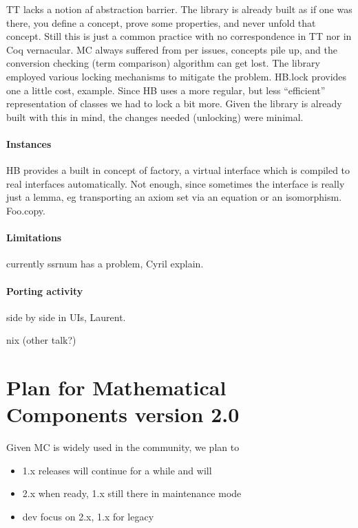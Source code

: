 \documentclass{easychair}
\begin{document}
TT lacks a notion af abstraction barrier. The library is already built
as if one was there, you define a concept, prove some properties, and never
unfold that concept. Still this is just a common practice with no correspondence
in TT nor in Coq vernacular. MC always suffered from per issues, concepts pile up,
and the conversion checking (term comparison) algorithm can get lost. The
library employed various locking mechanisms to mitigate the problem. HB.lock
provides one a little cost, example.
Since HB uses a more regular, but less ``efficient'' representation of classes
we had to lock a bit more. Given the library is already built with this in mind,
the changes needed (unlocking) were minimal.

\paragraph{Instances}

HB provides a built in concept of factory, a virtual interface which is
compiled to real interfaces automatically. Not enough, since sometimes the
interface is really just a lemma, eg transporting an axiom set via an equation
or an isomorphism. Foo.copy.

\paragraph{Limitations}

currently ssrnum has a problem, Cyril explain.

\paragraph{Porting activity}

side by side in UIs, Laurent.

nix (other talk?)

\section{Plan for Mathematical Components version 2.0}

Given MC is widely used in the community, we plan to

\begin{itemize}
\item 1.x releases will continue for a while and will
\item 2.x when ready, 1.x still there in maintenance mode
\item dev focus on 2.x, 1.x for legacy
\end{itemize}

\label{sect:bib}

%
%
%


\end{document}
